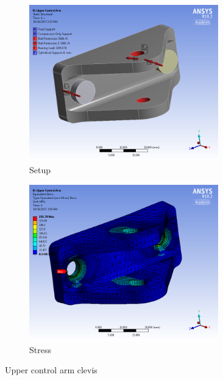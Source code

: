 \documentclass[10pt]{article}
\begin{document}
\begin{figure}[H]
\centering
\begin{subfigure}[b]{.48\textwidth}
\centering
\includegraphics[width=0.9\textwidth]{figures/fea/parts/MS00029-UpperControlArmClevis-Setup}
\caption{Setup}
\end{subfigure}
\begin{subfigure}[b]{.48\textwidth}
\centering
\includegraphics[width=0.9\textwidth]{figures/fea/parts/MS00029-UpperControlArmClevis-Stress}
\caption{Stress}
\end{subfigure}
\caption{Upper control arm clevis}
\label{fig:MS00029-UpperControlArmClevis}
\end{figure}
\end{document}
